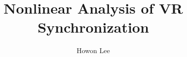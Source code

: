 \documentclass[12pt]{article}
\begin{document}
\title{Nonlinear Analysis of VR Synchronization}
\author{Howon Lee}
\maketitle

\end{document}

